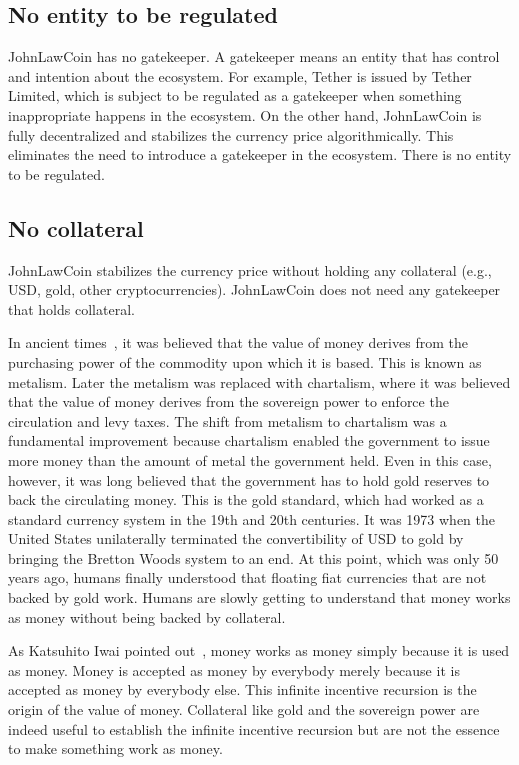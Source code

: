 \documentclass[dvipdfmx,a4paper]{article}
\begin{document}
\subsection{No entity to be regulated}

JohnLawCoin has no gatekeeper. A gatekeeper means an entity that has control and intention about the ecosystem. For example, Tether is issued by Tether Limited, which is subject to be regulated as a gatekeeper when something inappropriate happens in the ecosystem. On the other hand, JohnLawCoin is fully decentralized and stabilizes the currency price algorithmically. This eliminates the need to introduce a gatekeeper in the ecosystem. There is no entity to be regulated.

\subsection{No collateral}

JohnLawCoin stabilizes the currency price without holding any collateral (e.g., USD, gold, other cryptocurrencies). JohnLawCoin does not need any gatekeeper that holds collateral.

In ancient times~\cite{davies2010history,ferguson2008ascent}, it was believed that the value of money derives from the purchasing power of the commodity upon which it is based. This is known as metalism. Later the metalism was replaced with chartalism, where it was believed that the value of money derives from the sovereign power to enforce the circulation and levy taxes. The shift from metalism to chartalism was a fundamental improvement because chartalism enabled the government to issue more money than the amount of metal the government held. Even in this case, however, it was long believed that the government has to hold gold reserves to back the circulating money. This is the gold standard, which had worked as a standard currency system in the 19th and 20th centuries. It was 1973 when the United States unilaterally terminated the convertibility of USD to gold by bringing the Bretton Woods system to an end. At this point, which was only 50 years ago, humans finally understood that floating fiat currencies that are not backed by gold work. Humans are slowly getting to understand that money works as money without being backed by collateral.

As Katsuhito Iwai pointed out~\cite{iwai1996boostrap,iwai1997evolution}, money works as money simply because it is used as money. Money is accepted as money by everybody merely because it is accepted as money by everybody else. This infinite incentive recursion is the origin of the value of money. Collateral like gold and the sovereign power are indeed useful to establish the infinite incentive recursion but are not the essence to make something work as money.
\end{document}
